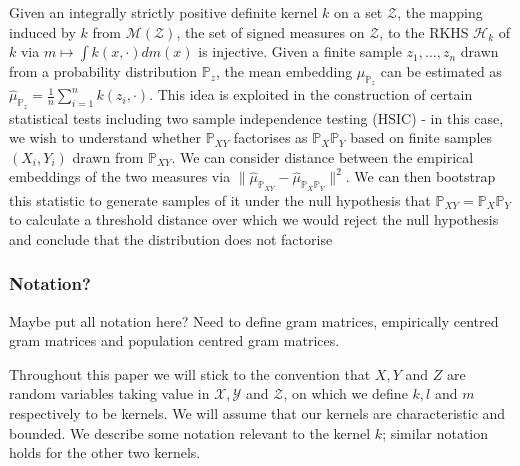 \documentclass{article}
\begin{document}
Given an integrally strictly positive definite kernel $k$ on a set $\mathcal{Z}$, the mapping induced by $k$ from $\mathcal{M(Z)}$, the set of signed measures on $\mathcal{Z}$, to the RKHS $\mathcal{H}_k$ of $k$ via $m \mapsto \int k(x,\cdot)dm(x)$ is injective. Given a finite sample $z_1,\ldots,z_n$ drawn from a probability distribution $\mathbb{P}_z$, the mean embedding $\mu_{\mathbb{P}_z}$ can be estimated as $\hat\mu_{\mathbb{P}_z} = \frac{1}{n}\sum_{i=1}^{n}k(z_i,\cdot)$. This idea is exploited in the construction of certain statistical tests including two sample independence testing (HSIC) - in this case, we wish to understand whether $\mathbb{P}_{XY}$ factorises as $\mathbb{P}_{X}\mathbb{P}_{Y}$ based on finite samples $(X_i,Y_i)$ drawn from $\mathbb{P}_{XY}$. We can consider distance between the empirical embeddings of the two measures via $\| \hat\mu_{\mathbb{P}_{XY}}  - \hat\mu_{\mathbb{P}_{X}\mathbb{P}_{Y}}\|^2$. We can then bootstrap this statistic to generate samples of it under the null hypothesis that $\mathbb{P}_{XY} = \mathbb{P}_{X}\mathbb{P}_{Y}$ to calculate a threshold distance over which we would reject the null hypothesis and conclude that the distribution does not factorise

\subsubsection{Notation?}

Maybe put all notation here? Need to define gram matrices, empirically centred gram matrices and population centred gram matrices.

Throughout this paper we will stick to the convention that $X,Y$ and $Z$ are random variables taking value in $\mathcal{X}, \mathcal{Y}$ and $\mathcal{Z}$, on which we define $k, l$ and $m$ respectively to be kernels. We will assume that our kernels are characteristic and bounded. We describe some notation relevant to the kernel $k$; similar notation holds for the other two kernels.
\end{document}
